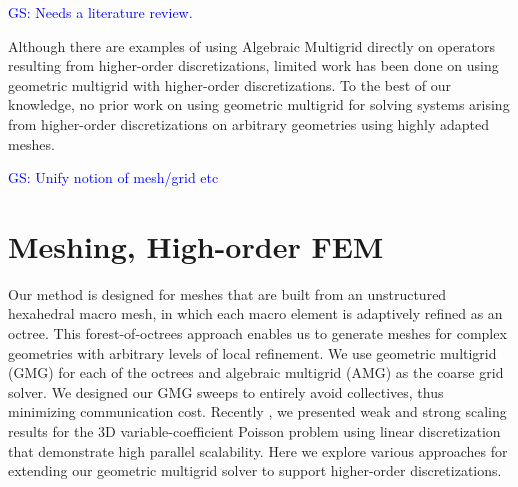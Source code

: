 \documentclass[times]{nlaauth}
\newcommand{\gsnote}[1]{\textcolor{blue}{GS: #1}}
\begin{document}
\gsnote{Needs a literature review.}



Although there are examples of using Algebraic Multigrid directly on
operators resulting from higher-order discretizations, limited work
has been done on using geometric multigrid with higher-order
discretizations. To the best of our knowledge, no prior work on using
geometric multigrid for solving systems arising from higher-order
discretizations on arbitrary geometries using highly adapted meshes.






\gsnote{Unify notion of mesh/grid etc}



\section{Meshing, High-order FEM}

Our method is designed for meshes that are built from an unstructured
hexahedral macro mesh, in which each macro element is adaptively
refined as an octree. This forest-of-octrees approach enables us to
generate meshes for complex geometries with arbitrary levels of local
refinement. We use geometric multigrid (GMG) for each of the octrees
and algebraic multigrid (AMG) as the coarse grid solver. We designed
our GMG sweeps to entirely avoid collectives, thus minimizing
communication cost. Recently \cite{SundarBirosBursteddeEtAl12}, we
presented weak and strong scaling results for the 3D
variable-coefficient Poisson problem using linear discretization that
demonstrate high parallel scalability. Here we explore various
approaches for extending our geometric multigrid solver to support
higher-order discretizations.
\end{document}
